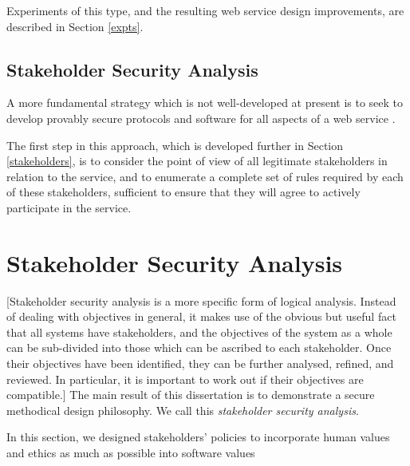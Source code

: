 Experiments of this type, and the resulting web service design improvements,
are described in Section \ref{expts}.



\subsection{Stakeholder Security Analysis}\label{stsecanal}

A more fundamental strategy which is not well-developed at present is
to seek to develop provably secure protocols and software for all aspects
of a web service \cite{whitman2011principles,mailloux2018examination,bishop2005introduction}.

The first step in this approach, which is developed further in 
Section \ref{stakeholders}, is to consider the point of view of all legitimate stakeholders
in relation to the service, and to enumerate a complete set of rules
required by each of these stakeholders, sufficient to ensure that they
will agree to actively participate in the service.


\section{Stakeholder Security Analysis}

[Stakeholder security analysis is a more specific form of logical analysis. Instead of dealing with
objectives in general, it makes use of the obvious but useful fact that all systems have
stakeholders, and the objectives of the system as a whole can be sub-divided into those
which can be ascribed to each stakeholder. Once their objectives have been identified, they
can be further analysed, refined, and reviewed. In particular, it is important to work out if
their objectives are compatible.]
The main result of this dissertation is to demonstrate  a secure methodical design philosophy.
We call this {\em stakeholder security analysis}.
\iffalse
Every business, organization, or community has {\em stakeholders}. These are the people (or agents) who have an interest in any aspect of its operation. In many cases, there will be a large group of {\em clients}, i.e. individuals who receive a service. There may be one or more {\em owners}. There are also many other ways a person, agent, or entity can have an interest in a given organisation or entity. One organization can be a stakeholder in another.
\fi
In this section, we designed stakeholders' policies to incorporate human
values and ethics as much as possible into software values

